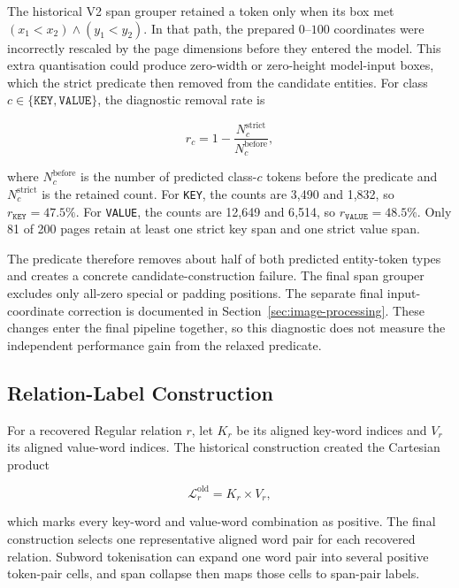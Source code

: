 The historical V2 span grouper retained a token only when its box met
$(x_1<x_2)\wedge(y_1<y_2)$. In that path, the prepared $0$--$100$ coordinates
were incorrectly rescaled by the page dimensions before they entered the
model. This extra quantisation could produce zero-width or zero-height
model-input boxes, which the strict predicate then removed from the candidate
entities. For
class $c\in\{\texttt{KEY},\texttt{VALUE}\}$, the diagnostic removal rate is

\begin{equation}
  r_c = 1 - \frac{N_c^{\mathrm{strict}}}{N_c^{\mathrm{before}}},
\end{equation}

where $N_c^{\mathrm{before}}$ is the number of predicted class-$c$ tokens before
the predicate and $N_c^{\mathrm{strict}}$ is the retained count. For
\texttt{KEY}, the counts are 3{,}490 and 1{,}832, so $r_{\texttt{KEY}}=47.5\%$.
For \texttt{VALUE}, the counts are 12{,}649 and 6{,}514, so
$r_{\texttt{VALUE}}=48.5\%$. Only 81 of 200 pages retain at least one strict key
span and one strict value span.

The predicate therefore removes about half of both predicted entity-token
types and creates a concrete candidate-construction failure. The final span
grouper excludes only all-zero special or padding positions. The separate final
input-coordinate correction is documented in
Section~\ref{sec:image-processing}. These changes enter the final pipeline
together, so this diagnostic does not measure the independent performance gain
from the relaxed predicate.

\subsection{Relation-Label Construction}

For a recovered Regular relation $r$, let $K_r$ be its aligned key-word indices
and $V_r$ its aligned value-word indices. The historical construction created
the Cartesian product

\begin{equation}
  \mathcal{L}^{\mathrm{old}}_r = K_r \times V_r,
\end{equation}

which marks every key-word and value-word combination as positive. The final
construction selects one representative aligned word pair for each recovered
relation. Subword tokenisation can expand one word pair into several positive
token-pair cells, and span collapse then maps those cells to span-pair labels.

